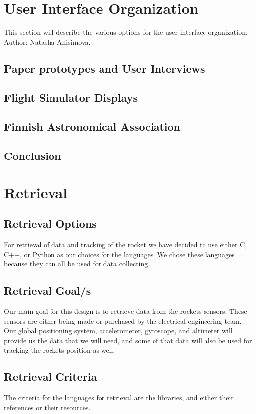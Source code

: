 \documentclass[10pt,draftclsnofoot,onecolumn]{IEEEtran}
\begin{document}
	
	\section{User Interface Organization}
	This section will describe the various options for the user interface organization. Author: Natasha Anisimova.
	
	\subsection{Paper prototypes and User Interviews}
	
	\subsection{Flight Simulator Displays}
	
	\subsection{Finnish Astronomical Association}
	
	\subsection{Conclusion}
	
	\section{Retrieval}
\subsection{Retrieval Options}
 For retrieval of data and tracking of the rocket we have decided to use either C, C++, or Python as our choices for the languages.  We chose these languages because they can all be used for data collecting.
 \subsection{Retrieval Goal/s}
 Our main goal for this design is to retrieve data from the rockets sensors.  These sensors are either being made or purchased by the electrical engineering team.  Our global positioning system, accelerometer, gyroscope, and altimeter will provide us the data that we will need, and some of that data will also be used for tracking the rockets position as well.
  \subsection{Retrieval Criteria}
   The criteria for the languages for retrieval are the libraries, and either their references or their resources.
\end{document}
